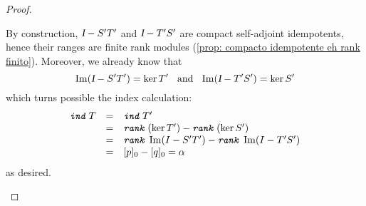 \begin{proposicao}
\begin{proof}
\begin{itroman}
            By construction, $\textsl{I} - S'T'$ and $\textsl{I} - T'S'$ are compact self-adjoint idempotents, hence their ranges are finite rank modules (\ref{prop: compacto idempotente eh rank finito}). Moreover, we already know that
            \begin{equation*}
                \operatorname{Im}(\textsl{I} - S'T') = \ker T' \hspace{0.25cm}\operatorname{and}\hspace{0.25cm} \operatorname{Im}(\textsl{I} - T'S') = \ker S'
            \end{equation*}
            which turns possible the index calculation: 
            \begin{equation*}
                \begin{array}{rcl}
                    \texttt{\textit{ind}}\, T &=& \texttt{\textit{ind}}\, {T}'\\
                    &=& \texttt{\textit{rank}}\,(\ker T') - \texttt{\textit{rank}}\,(\ker S') \\
                    &=& \texttt{\textit{rank}}\, \operatorname{Im}(I-{S}' {T}')-\texttt{\textit{rank}}\, \operatorname{Im} (I-{T}' {S}')\\
                    &=& [p]_0-[q]_0 = \alpha
                \end{array}
            \end{equation*}
            as desired. \hfill \qedhere
        \end{itroman}
    \end{proof}
\end{proposicao}
